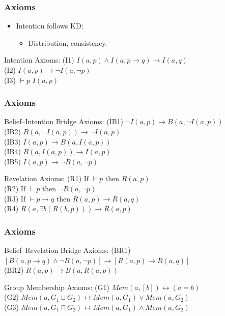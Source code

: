 \documentclass[aspectratio=169]{beamer}
\begin{document}
\begin{frame}
\frametitle{Axioms}
\Large 
\begin{itemize}
    \item Intention follows KD:
    \begin{itemize}
        \Large 
        \item Distribution, consistency.
    \end{itemize}
\end{itemize}
\begin{block}{Intention Axioms:}
    \Large
    \normalfont
    (I1) $I(a, p) \wedge I(a, p \rightarrow q) \rightarrow I(a, q)$ \\
    (I2) $I(a, p) \rightarrow \neg I(a, \neg p)$ \\
    (I3)  $\vdash p$  $I(a, p)$
\end{block}
\end{frame}

\begin{frame}
\frametitle{Axioms}
\begin{block}{Belief--Intention Bridge Axioms:}
    \Large
    \normalfont
    (IB1) $\neg I(a, p) \rightarrow B(a, \neg I(a, p))$ \\
    (IB2) $B(a, \neg I(a, p)) \rightarrow \neg I(a, p)$ \\
    (IB3) $I(a, p) \rightarrow B(a, I(a,  p))$ \\
    (IB4) $B(a, I(a, p)) \rightarrow I(a, p)$ \\
    (IB5) $I(a, p) \rightarrow \neg B(a, \neg p)$
\end{block}
\begin{block}{Revelation Axioms:}
    \Large
    \normalfont
    (R1) $\text{If } \vdash p \text{ then } R(a, p)$ \\
    (R2) $\text{If } \vdash p \text{ then } \neg R(a, \neg p)$ \\
    (R3) $\text{If } \vdash p \rightarrow q \text{ then } R(a, p) \rightarrow R(a, q)$ \\
    (R4) $R(a, \exists b(R(b, p))) \rightarrow R(a, p)$
\end{block}
\end{frame}

\begin{frame}
\frametitle{Axioms}
\begin{block}{Belief--Revelation Bridge Axioms:}
    \Large
    \normalfont
    (BR1) $[B(a, p \rightarrow q) \wedge \neg B(a, \neg p)] \rightarrow [R(a, p) \rightarrow R(a, q)]$ \\
    (BR2) $R(a, p) \rightarrow B(a, R(a, p))$
\end{block}
\begin{block}{Group Membership Axioms:}
    \Large
    \normalfont
    (G1) $Mem(a, [b]) \leftrightarrow (a = b)$ \\
    (G2) $Mem(a, G_1 \sqcup G_2) \leftrightarrow Mem(a, G_1) \vee Mem(a, G_2)$ \\
    (G3) $Mem(a, G_1 \sqcap G_2) \leftrightarrow Mem(a, G_1) \wedge Mem(a, G_2)$
\end{block}
\end{frame}
\end{document}
